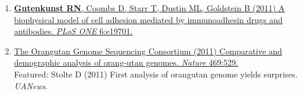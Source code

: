 \documentclass[11pt]{article}
\begin{document}
\begin{enumerate}
\item
\href{http://doi.org/10.1371/journal.pone.0019701}{\textbf{Gutenkunst RN}\corresponding, Coombs D, Starr T, Dustin ML, Goldstein B (2011) {A biophysical
  model of cell adhesion mediated by immunoadhesin drugs and antibodies}.
\newblock \emph{PLoS ONE} 6:e19701.}

\item 
\href{http://doi.org/10.1038/nature09687}{%
The Orangutan Genome Sequencing Consortium
  (2011) {Comparative
  and demographic analysis of orang-utan genomes}.
\newblock \emph{Nature} 469:529.}\\
 Featured: Stolte D (2011) First analysis of orangutan genome yields surprises. \emph{UANews}.


\end{enumerate}
\end{document}
